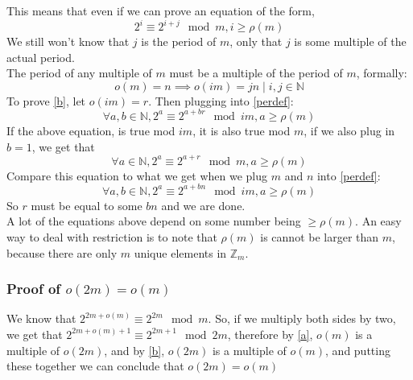 \documentclass{article}
\begin{document}
  This means that even if we can prove an equation of the form,
  \begin{equation}\label{a}
    2^i \equiv 2^{i+j} \mod m, i \geq \rho(m)
  \end{equation}
  We still won't know that $j$ is the period of $m$, only that $j$ is some multiple of the actual period.\\
  
  The period of any multiple of $m$ must be a multiple of the period of $m$, formally:
  \begin{equation}\label{b}
    o(m) = n \implies o(im) = jn \mid i, j \in \mathbb{N}
  \end{equation}
  To prove \eqref{b}, let $o(im) = r$. Then plugging into \eqref{perdef}:
  \begin{equation}
    \forall a, b \in \mathbb{N}, 2^a \equiv 2^{a+br} \mod im, a \geq \rho(m)
  \end{equation}
  If the above equation, is true mod $im$, it is also true mod $m$, if we also plug in $b=1$, we get that
  \begin{equation}
    \forall a \in \mathbb{N}, 2^a \equiv 2^{a+r} \mod m, a \geq \rho(m)
  \end{equation}
  Compare this equation to what we get when we plug $m$ and $n$ into \eqref{perdef}:
  \begin{equation}
    \forall a, b \in \mathbb{N}, 2^a \equiv 2^{a+bn} \mod im, a \geq \rho(m)
  \end{equation}
  So $r$ must be equal to some $bn$ and we are done.\\

  A lot of the equations above depend on some number being $\geq \rho(m)$. An easy way to deal with restriction is to note that $\rho(m)$ is cannot be larger than $m$, because there are only $m$ unique elements in $\mathbb{Z}_m$. 
  \subsubsection{Proof of $o(2m) = o(m)$}
  We know that $2^{2m+o(m)} \equiv 2^{2m} \mod m$. So, if we multiply both sides by two, we get that $2^{2m + o(m) + 1}\equiv 2^{2m+1} \mod 2m$, therefore by \eqref{a}, $o(m)$ is a multiple of $o(2m)$, and by \eqref{b}, $o(2m)$ is a multiple of $o(m)$, and putting these together we can conclude that $o(2m) = o(m)$  
\end{document}

